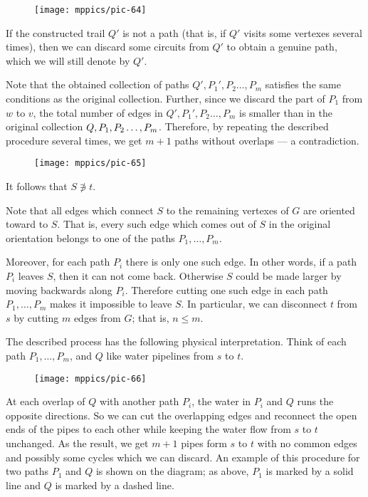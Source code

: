 \begin{wrapfigure}{o}{30 mm}
\vskip-0mm
\centering
\texttt{[image: mppics/pic-64]}
\vskip0mm
\end{wrapfigure}
If the constructed trail $Q'$ is not a path (that is, if $Q'$ visits some vertexes several times), then we can discard some circuits from $Q'$ to obtain a genuine path, 
which we will still denote by $Q'$.

Note that the obtained collection of paths $Q', P_1',P_2\dots,P_m$ satisfies the same conditions as the original collection.
Further, since we discard the part of $P_1$ from $w$ to $v$, the total number of edges in $Q', P_1',P_2\dots,P_m$
is smaller than in the original collection $Q, P_1,P_2\z\dots,P_m$.
Therefore, by repeating the described procedure several times, we get $m+1$ paths without overlaps --- a contradiction.

{

\begin{wrapfigure}{r}{40 mm}
\vskip-2mm
\centering
\texttt{[image: mppics/pic-65]}
\vskip0mm
\end{wrapfigure}

It follows that $S\not\ni t$.

Note that all edges which connect $S$ to the remaining vertexes of $G$ are oriented toward to $S$.
That is, every such edge which comes out of $S$ in the original orientation belongs to one of the paths $P_1,\dots,P_m$.

Moreover, for each path $P_i$ there is only one such edge.
In other words, if a path $P_i$ leaves $S$, then it can not come back. 
Otherwise $S$ could be made larger by moving backwards along $P_i$.
Therefore cutting one such edge in each path $P_1,\dots,P_m$ makes it impossible to leave $S$.
In particular, we can disconnect $t$ from $s$ by cutting $m$ edges from $G$; that is, $n\le m$.
\qeds

}

The described process has the following physical interpretation.
Think of each path $P_1,\dots,P_m$, and $Q$ like water pipelines from $s$ to $t$.
\begin{figure}[h!]%
\vskip0mm
\centering
\texttt{[image: mppics/pic-66]}
\vskip0mm
\end{figure}
At each overlap of $Q$ with another path $P_i$, the water in $P_i$ and $Q$ runs the opposite directions.
So we can cut the overlapping edges and reconnect the open ends of the pipes to each other while keeping the water flow from $s$ to $t$ unchanged.
As the result, we get $m+1$ pipes form $s$ to $t$ with no common edges and possibly some cycles which we can discard.
An example of this procedure for two paths $P_1$ and $Q$ is shown on the diagram;
as above, $P_1$ is marked by a solid line and $Q$ is marked by a dashed line.


